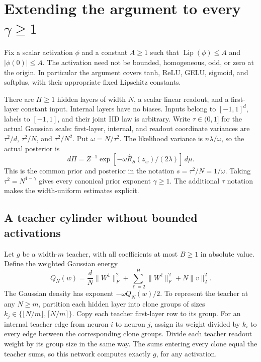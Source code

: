 \section{Extending the argument to every $\gamma\ge1$}
\label{ag-sec:general-lipschitz-raw}

Fix a scalar activation $\phi$ and a constant $A\geq1$ such that
$\operatorname{Lip}(\phi)\leq A$ and $|\phi(0)|\leq A$.
The activation need not be bounded, homogeneous, odd, or zero at the
origin.  In particular the argument covers tanh, ReLU, GELU, sigmoid,
and softplus, with their appropriate fixed Lipschitz constants.

There are $H\geq1$ hidden layers of width $N$, a scalar linear readout,
and a first-layer constant input.  Internal layers have no biases.
Inputs belong to $[-1,1]^d$, labels to $[-1,1]$, and their joint IID
law is arbitrary.  Write $\tau\in(0,1]$ for the actual Gaussian scale:
first-layer, internal, and readout coordinate variances are
$\tau^2/d$, $\tau^2/N$, and $\tau^2/N^2$.
Put $\omega=N/\tau^2$.  The likelihood variance is $n\lambda/\omega$,
so the actual posterior is
\[
 d\Pi=Z^{-1}\exp[-\omega\widehat R_S(z_w)/(2\lambda)]\,d\mu.
\]
This is the common prior and posterior in the notation $s=\tau^2/N=1/\omega$. Taking $\tau^2=N^{1-\gamma}$ gives every canonical prior exponent $\gamma\ge1$. The additional $\tau$ notation makes the width-uniform estimates explicit.

\subsection{A teacher cylinder without bounded activations}

Let $g$ be a width-$m$ teacher, with all coefficients at most $B\geq1$
in absolute value.  Define the weighted Gaussian energy
\[
 Q_N(w)=\frac dN\|W^1\|_F^2+
             \sum_{\ell=2}^H\|W^\ell\|_F^2+N\|v\|_2^2.
\]
The Gaussian density has exponent $-\omega Q_N(w)/2$.
To represent the teacher at any $N\geq m$, partition each hidden
layer into clone groups of sizes
$k_j\in\{\lfloor N/m\rfloor,\lceil N/m\rceil\}$.
Copy each teacher first-layer row to its group. For an internal
teacher edge from neuron $i$ to neuron $j$, assign its weight divided
by $k_i$ to every edge between the corresponding clone groups.
Divide each teacher readout weight by its group size in the same way.
The sums entering every clone equal the teacher sums, so this network
computes exactly $g$, for any activation.

